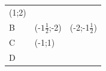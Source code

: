 {\begin{center}
\begin{xtabular*}{\mytablewidth}[t]{|p{10\mystarwidth}|p{10\mystarwidth}|p{10\mystarwidth}|}
        (1;2)%
     \tabularnewline{}
    
    
        B &
    
    
        (-$1\frac{1}{2}$;-2) &
    
    
        (-2;-1$\frac{1}{2}$)%
     \tabularnewline{}
    
    
        C &
    
    
        (-1;1) &
    
    
     \tabularnewline{}
    
    
        D &
    

\end{xtabular*}
\end{center}}
